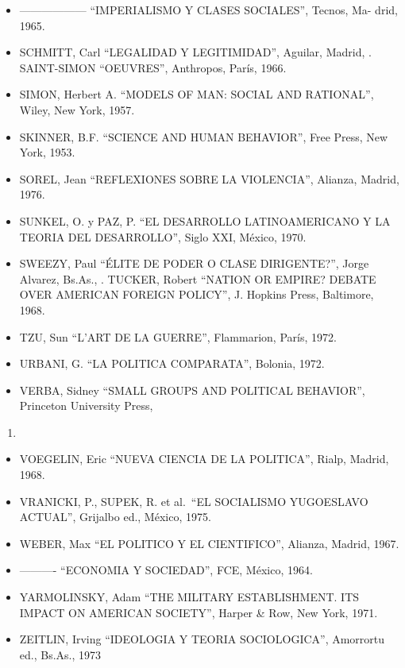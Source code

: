 \documentclass[
]{book}
\providecommand{\tightlist}{%
  \setlength{\itemsep}{0pt}\setlength{\parskip}{0pt}}
\begin{document}
\begin{itemize}
\tightlist
\item
  ------------------ ``IMPERIALISMO Y CLASES SOCIALES'', Tecnos, Ma- drid, 1965.
\item
  SCHMITT, Carl ``LEGALIDAD Y LEGITIMIDAD'', Aguilar, Madrid, . SAINT-SIMON
  ``OEUVRES'', Anthropos, París, 1966.
\item
  SIMON, Herbert A. ``MODELS OF MAN: SOCIAL AND RATIONAL'', Wiley, New York, 1957.
\item
  SKINNER, B.F. ``SCIENCE AND HUMAN BEHAVIOR'', Free Press, New York, 1953.
\item
  SOREL, Jean ``REFLEXIONES SOBRE LA VIOLENCIA'', Alianza, Madrid, 1976.
\item
  SUNKEL, O. y PAZ, P. ``EL DESARROLLO LATINOAMERICANO Y LA TEORIA DEL
  DESARROLLO'', Siglo XXI, México, 1970.
\item
  SWEEZY, Paul ``ÉLITE DE PODER O CLASE DIRIGENTE?'', Jorge Alvarez, Bs.As., . TUCKER,
  Robert ``NATION OR EMPIRE? DEBATE OVER AMERICAN FOREIGN POLICY'', J. Hopkins
  Press, Baltimore, 1968.
\item
  TZU, Sun ``L'ART DE LA GUERRE'', Flammarion, París, 1972.
\item
  URBANI, G. ``LA POLITICA COMPARATA'', Bolonia, 1972.
\item
  VERBA, Sidney ``SMALL GROUPS AND POLITICAL BEHAVIOR'', Princeton University Press,
\end{itemize}

\begin{enumerate}
\def\labelenumi{\arabic{enumi}.}
\setcounter{enumi}{1960}
\tightlist
\item
\end{enumerate}

\begin{itemize}
\tightlist
\item
  VOEGELIN, Eric ``NUEVA CIENCIA DE LA POLITICA'', Rialp, Madrid, 1968.
\item
  VRANICKI, P., SUPEK, R. et al.~``EL SOCIALISMO YUGOESLAVO ACTUAL'', Grijalbo ed.,
  México, 1975.
\item
  WEBER, Max ``EL POLITICO Y EL CIENTIFICO'', Alianza, Madrid, 1967.
\item
  ---------- ``ECONOMIA Y SOCIEDAD'', FCE, México, 1964.
\item
  YARMOLINSKY, Adam ``THE MILITARY ESTABLISHMENT. ITS IMPACT ON AMERICAN
  SOCIETY'', Harper \& Row, New York, 1971.
\item
  ZEITLIN, Irving ``IDEOLOGIA Y TEORIA SOCIOLOGICA'', Amorrortu ed., Bs.As., 1973
\end{itemize}

  
\end{document}
